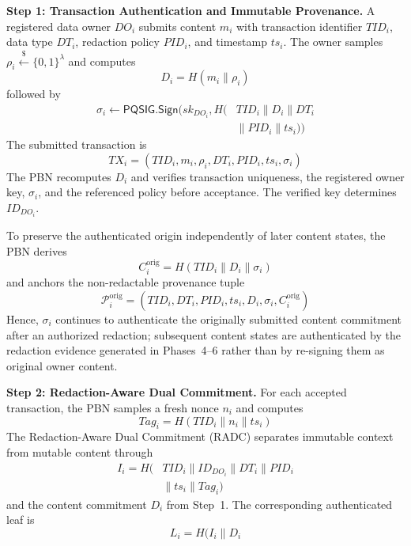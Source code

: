 \documentclass[lettersize,journal]{IEEEtran}
\begin{document}
\medskip
\noindent\textbf{Step 1: Transaction Authentication and Immutable
Provenance.}
A registered data owner $DO_i$ submits content $m_i$ with transaction
identifier $TID_i$, data type $DT_i$, redaction policy $PID_i$, and
timestamp $ts_i$. The owner samples
$\rho_i\stackrel{\$}{\leftarrow}\{0,1\}^{\lambda}$ and computes
\begin{equation}
D_i=H(m_i\parallel\rho_i)
\end{equation}
followed by
\begin{equation}
\begin{aligned}
\sigma_i\leftarrow
\mathsf{PQSIG.Sign}\big(
sk_{DO_i},
H(&TID_i\parallel D_i\parallel DT_i\\
&\parallel PID_i\parallel ts_i)\big)
\end{aligned}
\end{equation}
The submitted transaction is
\begin{equation}
TX_i=(TID_i,m_i,\rho_i,DT_i,PID_i,ts_i,\sigma_i)
\end{equation}
The PBN recomputes $D_i$ and verifies transaction uniqueness, the
registered owner key, $\sigma_i$, and the referenced policy before
acceptance. The verified key determines $ID_{DO_i}$.

To preserve the authenticated origin independently of later content
states, the PBN derives
\begin{equation}
C_i^{\mathrm{orig}}
=
H(TID_i\parallel D_i\parallel\sigma_i)
\end{equation}
and anchors the non-redactable provenance tuple
\begin{equation}
\mathcal{P}_i^{\mathrm{orig}}
=
(TID_i,DT_i,PID_i,ts_i,D_i,\sigma_i,C_i^{\mathrm{orig}})
\end{equation}
Hence, $\sigma_i$ continues to authenticate the originally submitted
content commitment after an authorized redaction; subsequent content
states are authenticated by the redaction evidence generated in
Phases~4--6 rather than by re-signing them as original owner content.

\medskip
\noindent\textbf{Step 2: Redaction-Aware Dual Commitment.}
For each accepted transaction, the PBN samples a fresh nonce $n_i$ and
computes
\begin{equation}
Tag_i=H(TID_i\parallel n_i\parallel ts_i)
\end{equation}
The Redaction-Aware Dual Commitment (RADC) separates immutable context
from mutable content through
\begin{equation}
\begin{aligned}
I_i=H(&TID_i\parallel ID_{DO_i}\parallel DT_i
\parallel PID_i\\
&\parallel ts_i\parallel Tag_i)
\end{aligned}
\end{equation}
and the content commitment $D_i$ from Step~1. The corresponding
authenticated leaf is
\begin{equation}
L_i=H(I_i\parallel D_i
\end{equation}
\end{document}
